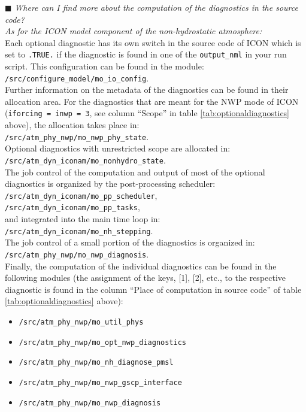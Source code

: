 $\blacksquare$ \emph{Where can I find more about the computation of the diagnostics in the source code?} \\

\emph{As for the ICON model component of the non-hydrostatic atmosphere:}\\

Each optional diagnostic has its own switch in the source code of ICON
which is set to \texttt{.TRUE.} if the diagnostic is found in one of the \texttt{output\_nml} in your run script.
This configuration can be found in the module: \\
\texttt{/src/configure\_model/mo\_io\_config}. \\

Further information on the metadata of the diagnostics can be found
in their allocation area.
For the diagnostics that are meant for the NWP mode of ICON
(\texttt{iforcing = inwp = 3}, see column ``Scope'' in table \ref{tab:optionaldiagnostics} above),
the allocation takes place in:\\
\texttt{/src/atm\_phy\_nwp/mo\_nwp\_phy\_state}.\\
Optional diagnostics with unrestricted scope are allocated in:\\
\texttt{/src/atm\_dyn\_iconam/mo\_nonhydro\_state}.\\

The job control of the computation and output of most of the optional diagnostics
is organized by the post-processing scheduler:\\
\texttt{/src/atm\_dyn\_iconam/mo\_pp\_scheduler}, \\
\texttt{/src/atm\_dyn\_iconam/mo\_pp\_tasks}, \\
and integrated into the main time loop in:\\
\texttt{/src/atm\_dyn\_iconam/mo\_nh\_stepping}.\\
The job control of a small portion of the diagnostics
is organized in: \\
\texttt{/src/atm\_phy\_nwp/mo\_nwp\_diagnosis}.\\

Finally, the computation of the individual diagnostics can be found
in the following modules
(the assignment of the keys, {[1]}, {[2]}, etc., to the respective diagnostic
is found in the column ``Place of computation in source code'' of table \ref{tab:optionaldiagnostics} above):
%
\begin{itemize}
\setlength\itemsep{-0.3em}
\item[{[1]}] \texttt{/src/atm\_phy\_nwp/mo\_util\_phys}
\item[{[2]}] \texttt{/src/atm\_phy\_nwp/mo\_opt\_nwp\_diagnostics}
\item[{[3]}] \texttt{/src/atm\_phy\_nwp/mo\_nh\_diagnose\_pmsl} 
\item[{[4]}] \texttt{/src/atm\_phy\_nwp/mo\_nwp\_gscp\_interface}
\item[{[5]}] \texttt{/src/atm\_phy\_nwp/mo\_nwp\_diagnosis}
\end{itemize}
%

